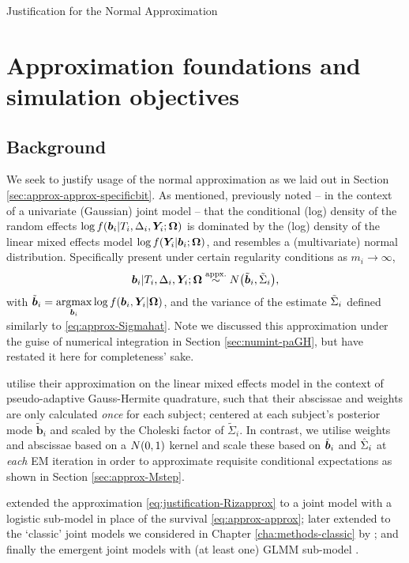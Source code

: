 \begin{chapter}{\label{cha:justification}Justification for the Normal Approximation}
  \section{Approximation foundations and simulation objectives}\label{sec:justification-background-objectives}
  \subsection{Background}\label{sec:justification-background}
  We seek to justify usage of the normal approximation as we laid out in Section \ref{sec:approx-approx-specificbit}. As mentioned, \citet{Rizopoulos2012} previously noted -- in the context of a univariate (Gaussian) joint model -- that the conditional (log) density of the random effects $\log f(\bm{b}_i|T_i,\Delta_i,\bm{Y}_i;\bm{\mathrm{\Omega}})$ is dominated by the (log) density of the linear mixed effects model $\log f(\bm{Y}_i|\bm{b}_i;\bm{\mathrm{\Omega}})$, and resembles a (multivariate) normal distribution. Specifically \citet{Rizopoulos2012} present under certain regularity conditions as $m_i\rightarrow\infty$,  
  \begin{align}
    \bm{b}_i|T_i,\Delta_i,\bm{Y}_i;\bm{\mathrm{\Omega}}\overset{\text{appx.}}{\sim} N\big(\tilde{\bm{b}}_i,\tilde{\Sigma}_i\big),
  \label{eq:justification-Rizapprox}
  \end{align}
  with $\tilde{\bm{b}}_i=\underset{\bm{b}_i}{\rm{argmax}}\log f(\bm{b}_i, \bm{Y}_i| \bm{\mathrm{\Omega}})$, and the variance of the estimate $\tilde{\Sigma}_i$ defined similarly to \eqref{eq:approx-Sigmahat}. Note we discussed this approximation under the guise of numerical integration in Section \ref{sec:numint-paGH}, but have restated it here for completeness' sake.
  
  \citet{Rizopoulos2012} utilise their approximation on the linear mixed effects model in the context of pseudo-adaptive Gauss-Hermite quadrature, such that their abscissae and weights are only calculated \textit{once} for each subject; centered at each subject's posterior mode $\tilde{\bm{b}}_i$ and scaled by the Choleski factor of $\tilde{\Sigma}_i$. In contrast, we utilise weights and abscissae based on a $N\!\left(0,1\right)$ kernel and scale these based on $\hat{\bm{b}}_i$ and $\hat{\Sigma}_i$ at \textit{each} EM iteration in order to approximate requisite conditional expectations as shown in Section \ref{sec:approx-Mstep}.

  \citet{Bernhardt15} extended the approximation \eqref{eq:justification-Rizapprox} to a joint model with a logistic sub-model in place of the survival \eqref{eq:approx-approx}; later extended to the `classic' joint models we considered in Chapter \ref{cha:methods-classic} by \citet{Murray2022}; and finally the emergent joint models with (at least one) GLMM sub-model \citep{Murray2023}.


\end{chapter}
